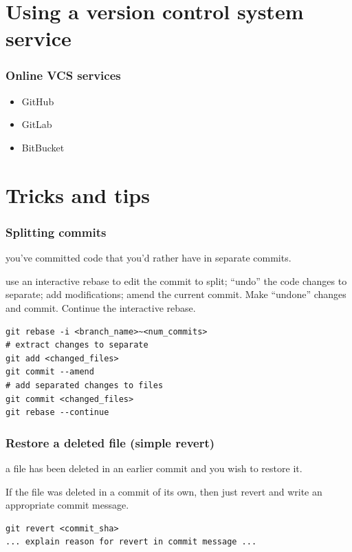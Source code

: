 \documentclass{git_course}
\begin{document}
\section{Using a version control system service}

\begin{frame}
    \frametitle{Online VCS services}
    \begin{itemize}
        \item GitHub
        \item GitLab
        \item BitBucket
    \end{itemize}
\end{frame}


\section{Tricks and tips}

\begin{frame}[fragile]
    \frametitle{Splitting commits}
     you've committed code that you'd rather have in
        separate commits.

     use an interactive rebase to edit the commit
        to split; ``undo'' the code changes to separate; add
        modifications; amend the current commit.
        Make ``undone'' changes and commit.  Continue
        the interactive rebase.
\begin{lstlisting}
git rebase -i <branch_name>~<num_commits>
# extract changes to separate
git add <changed_files>
git commit --amend
# add separated changes to files
git commit <changed_files>
git rebase --continue
\end{lstlisting}

\end{frame}

\begin{frame}[fragile]
    \frametitle{Restore a deleted file (simple revert)}
     a file has been deleted in an earlier commit and you wish
    to restore it.

     If the file was deleted in a commit of its own, then
    just revert and write an appropriate commit message.

\begin{lstlisting}
git revert <commit_sha>
... explain reason for revert in commit message ...
\end{lstlisting}
\end{frame}
\end{document}
